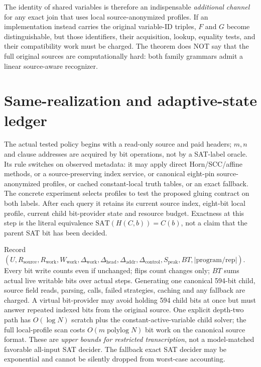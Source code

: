 \documentclass[11pt]{article}
\begin{document}
The identity of shared variables is therefore an indispensable
\emph{additional channel} for any exact join that uses local
source-anonymized profiles. If an implementation instead carries
the original variable-ID triples, $F$ and $G$ become distinguishable,
but those identifiers, their acquisition, lookup, equality tests,
and their compatibility work must be charged. The theorem does NOT
say that the full original sources are computationally hard: both
family grammars admit a linear source-aware recognizer.

\section{Same-realization and adaptive-state ledger}
The actual tested policy begins with a read-only source and paid
headers; $m,n$ and clause addresses are acquired by bit operations,
not by a SAT-label oracle. Its rule switches on observed metadata:
it may apply direct Horn/SCC/affine methods, or a source-preserving
index service, or canonical eight-pin source-anonymized profiles,
or cached constant-local truth tables, or an exact fallback.
The concrete experiment selects profiles to test the proposed
gluing contract on both labels. After each query it retains its
current source index, eight-bit local profile, current child
bit-provider state and resource budget. Exactness at this step is
the literal equivalence $\mathrm{SAT}(H(C,b))=C(b)$, not a claim
that the parent SAT bit has been decided.

Record $(U,R_{\mathrm{source}},R_{\mathrm{work}},
W_{\mathrm{work}},\Delta_{\mathrm{work}},
\Delta_{\mathrm{head}},\Delta_{\mathrm{addr}},
\Delta_{\mathrm{control}},S_{\mathrm{peak}},BT,
|\mathrm{program/rep}|)$. Every bit write counts even if unchanged;
flips count changes only; $BT$ sums actual live writable bits over
actual steps. Generating one canonical 594-bit child, source field
reads, parsing, calls, failed strategies, caching and any
fallback are charged. A virtual bit-provider may avoid holding 594
child bits at once but must answer repeated indexed bits from the
original source. One explicit depth-two path has $O(\log N)$
scratch plus the constant-active-variable child solver; the
full local-profile scan costs $O(m\operatorname{polylog}N)$
bit work on the canonical source format. These are
\emph{upper bounds for restricted transcription}, not a
model-matched favorable all-input SAT decider.
The fallback exact SAT decider may be exponential and cannot be
silently dropped from worst-case accounting.
\end{document}
